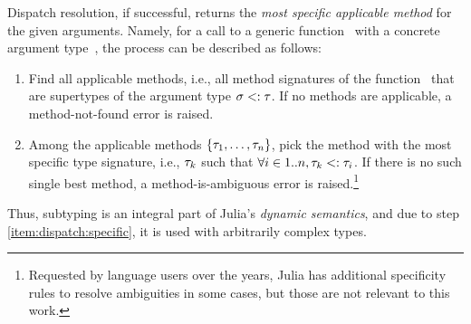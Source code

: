 Dispatch resolution, if successful, returns the \emph{most specific applicable
method} for the given arguments.
Namely, for a call to a generic function~ with a concrete argument
type~\gty, the process can be described as follows:
\begin{enumerate}
  \item Find all applicable methods, i.e., all method signatures \ty of the
    function~ that are supertypes of the argument type $\sigma <: \tau$.
    If no methods are applicable, a method-not-found error is raised.
  \item\label{item:dispatch:specific} Among 
    the applicable methods $\{\tau_1, \ldots, \tau_n\}$,
    pick the method with the most specific type signature,
    i.e., $\tau_k$ such that $\forall i\in1..n, \tau_k <: \tau_i$.
    If there is no such single best method, a method-is-ambiguous
    error is raised.\footnote{Requested by language users over the years,
    Julia has additional specificity rules to resolve ambiguities in some cases,
    but those are not relevant to this work.}
\end{enumerate}
Thus, subtyping is an integral part of Julia's \emph{dynamic semantics},
and due to step \ref{item:dispatch:specific}, it is used with
arbitrarily complex types.



